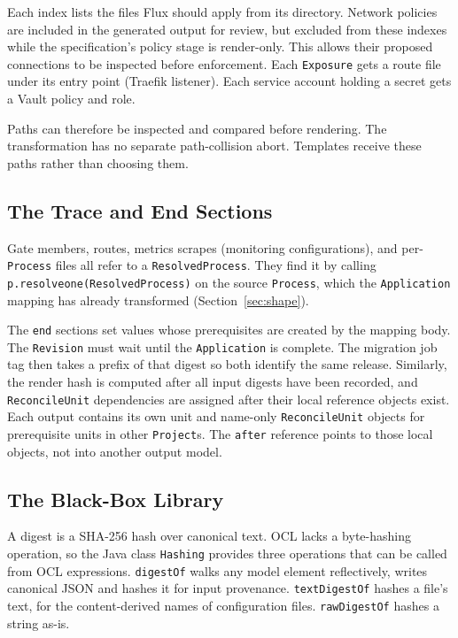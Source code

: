Each index lists the files Flux should apply from its directory. Network
policies are included in the generated output for review, but excluded from
these indexes while the specification's policy stage is render-only. This
allows their proposed connections to be inspected before enforcement. Each
\texttt{Exposure} gets a route file under its entry point (Traefik listener). Each service account
holding a secret gets a Vault policy and role.

Paths can therefore be inspected and compared before rendering. The
transformation has no separate path-collision abort. Templates receive
these paths rather than choosing them.

\subsection{The Trace and End Sections}
\label{sec:trace}

Gate members, routes, metrics scrapes (monitoring configurations), and per-\texttt{Process} files all refer
to a \texttt{ResolvedProcess}. They find it by calling
\texttt{p.resolveone(ResolvedProcess)} on the source \texttt{Process},
which the \texttt{Application} mapping has already transformed
(Section~\ref{sec:shape}).

The \texttt{end} sections set values whose prerequisites are created by the
mapping body. The \texttt{Revision} must wait until the
\texttt{Application} is complete. The migration job tag then takes a prefix
of that digest so both identify the same release. Similarly, the render
hash is computed after all input digests have been recorded, and
\texttt{ReconcileUnit} dependencies are assigned after their local
reference objects exist. Each output contains its own unit and name-only
\texttt{ReconcileUnit} objects for prerequisite units in other \texttt{Project}s.
The \texttt{after} reference points to those local objects, not into another output model.

\subsection{The Black-Box Library}
\label{sec:blackbox}

A digest is a SHA-256 hash over canonical text. OCL lacks a byte-hashing
operation, so the Java class \texttt{Hashing} provides three operations that can be called from OCL expressions. \texttt{digestOf} walks any model element reflectively, writes
canonical JSON and hashes it for input provenance. \texttt{textDigestOf} hashes a file's text, for the
content-derived names of configuration files. \texttt{rawDigestOf} hashes a string as-is.

